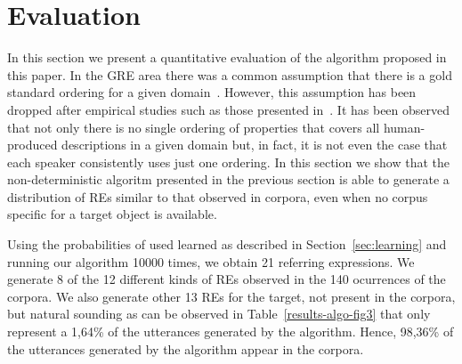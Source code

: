 \section{Evaluation}
\label{sec:evaluation}

In this section we present a quantitative evaluation of the algorithm proposed in this paper. In the GRE area there was a common assumption that there is a gold standard ordering for a given domain~\cite{Dale1995}. However, this assumption has been dropped after empirical studies such as those presented in~\cite{arec:refe08,viet:gene11}. It has been observed that not only there is no single ordering of properties that covers all human-produced descriptions in a given domain but, in fact, it is not even the case that each speaker consistently uses just one ordering. In this section we show that the non-deterministic algoritm presented in the previous section is able to generate a distribution of REs similar to that observed in corpora, even when no corpus specific for a target object is available. 

Using the probabilities of used learned as described in Section~\ref{sec:learning} and running our algorithm 10000 times, we obtain 21 referring expressions. We generate 8 of the 12 different kinds of REs observed in the 140 ocurrences of the corpora. We also generate other 13 REs for the target, not present in the corpora, but natural sounding as can be observed in Table~\ref{results-algo-fig3} that only represent a 1,64\% of the utterances generated by the algorithm. Hence, 98,36\% of the utterances generated by the algorithm appear in the corpora.  

